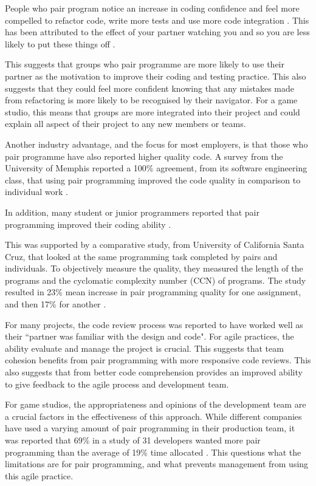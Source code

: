 \documentclass{scrartcl}
\begin{document}
People who pair program notice an increase in coding confidence and feel more compelled to refactor code, write more tests and use more code integration \cite{Sherrell:2006}. This has been attributed to the effect of your partner watching you and so you are less likely to put these things off \cite{Beck:2000}. 

This suggests that groups who pair programme are more likely to use their partner as the motivation to improve their coding and testing practice. This also suggests that they could feel more confident knowing that any mistakes made from refactoring is more likely to be recognised by their navigator. For a game studio, this means that groups are more integrated into their project and could explain all aspect of their project to any new members or teams.

Another industry advantage, and the focus for most employers, is that those who pair programme have also reported higher quality code. A survey from the University of Memphis reported a 100\% agreement, from its software engineering class, that using pair programming improved the code quality in comparison to individual work \cite{Sherrell:2006}.

 In addition, many student or junior programmers reported that pair programming improved their coding ability \cite{Radermacher:2011}.

This was supported by a comparative study, from University of California Santa Cruz, that looked at the same programming task completed by pairs and individuals. To objectively measure the quality, they measured the length of the programs and the cyclomatic complexity number (CCN)\cite{Xenos:2000} of programs. The study resulted in 23\% mean increase in pair programming quality for one assignment, and then 17\% for another \cite{Hanks:2004}.

For many projects, the code review process was reported to have worked well as their ``partner was familiar with the design and code"\cite{Vanhanen:2007}. For agile practices, the ability evaluate and manage the project is crucial. This suggests that team cohesion benefits from pair programming with more responsive code reviews. This also suggests that from better code comprehension provides an improved ability to give feedback to the agile process and development team.

For game studios, the appropriateness and opinions of the development team are a crucial factors in the effectiveness of this approach. While different companies have used a varying amount of pair programming in their production team, it was reported that 69\% in a study of 31 developers wanted more pair programming than the average of 19\% time allocated \cite{Plonka:2012}. This questions what the limitations are for pair programming, and what prevents management from using this agile practice.
\end{document}
